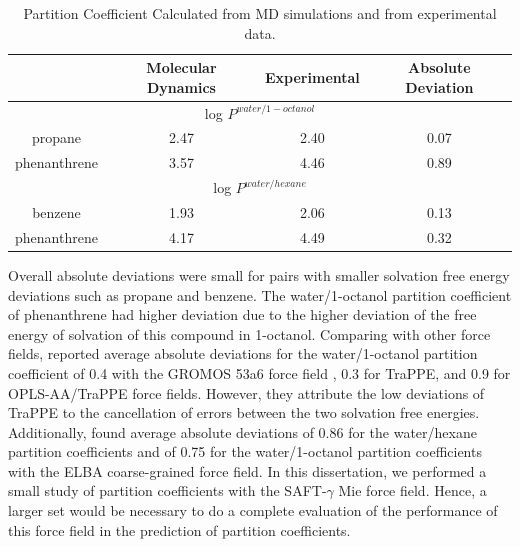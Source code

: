 \documentclass[
	12pt,				%
	openany,			%
	oneside,			%
	a4paper,			%
	english,			%
	brazil				%
	]{abntex2}
\providecommand{\DIFdelbegin}{}
\providecommand{\DIFdelbegin}{} %
\begin{document}
\begin{table}[H]
	\centering
	\caption{Partition Coefficient Calculated from MD simulations and from experimental data.}
	\label{tbl:part}
	\begin{tabular}{cccc}
		\hline\hline
		& {Molecular Dynamics} & {Experimental} & Absolute Deviation \\ \hline
		\multicolumn{4}{c}{log $P^{water/1-octanol}$}               \\ \hline
		propane      & 2.47                 & 2.40           & 0.07               \\
		phenanthrene & 3.57                 & 4.46           & 0.89               \\ \hline
		\multicolumn{4}{c}{log $P^{water/hexane}$}                 \\ \hline
		benzene      & 1.93                 & 2.06           & 0.13               \\
		phenanthrene & 4.17                 & 4.49           & 0.32               \\
		\hline\hline
	\end{tabular}

\end{table}

Overall absolute deviations were small for pairs with smaller solvation free energy deviations such as propane and benzene. The water/1-octanol partition coefficient of phenanthrene had higher deviation due to the higher deviation of the free energy of solvation of this compound in 1-octanol. Comparing with other force fields,  reported average absolute deviations for the water/1-octanol partition coefficient of 0.4 with the GROMOS 53a6 force field \cite{JCC:JCC20090}, 0.3 for TraPPE, and 0.9 for OPLS-AA/TraPPE force fields. However, they attribute the low deviations of TraPPE to the cancellation of errors between the two solvation free energies. Additionally,  found average absolute deviations of 0.86 for the water/hexane partition coefficients and of 0.75 for the water/1-octanol partition coefficients with the ELBA coarse-grained force field. In this dissertation, we performed a small study of partition coefficients with the SAFT-$\gamma$ Mie force field. Hence, a larger set would be necessary to do a complete evaluation of the performance of this force field in the prediction of partition coefficients.   
\DIFdelbegin %
\end{document}
